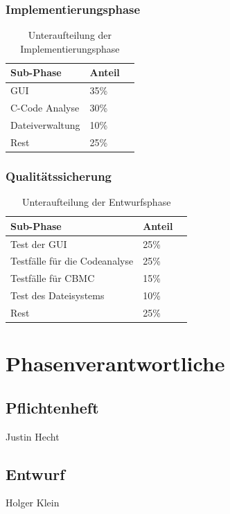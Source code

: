 \documentclass[a4paper]{scrreprt}
\begin{document}
\subsection{Implementierungsphase}

\begin{table}[H]
\centering
  \begin{tabular}{|p{3cm}|P{2cm}|P{2cm}|}
    Sub-Phase & Anteil \\ \hline
    GUI & 35\%\\ \hline
    C-Code Analyse & 30\% \\ \hline
    Dateiverwaltung & 10\% \\ \hline
    Rest & 25\%  \\
  \end{tabular}
  \newline\newline
  \caption{Unteraufteilung der Implementierungsphase}\label{impl}
\end{table} 

\subsection{Qualitätssicherung}
\begin{table}[H]
\centering
  \begin{tabular}{|p{3cm}|P{2cm}|P{2cm}|}
    Sub-Phase & Anteil \\ \hline
    Test der GUI & 25\% \\ \hline
    Testfälle  für die Codeanalyse & 25\% \\ \hline
    Testfälle für CBMC & 15\% \\ \hline
    Test des Dateisystems & 10\% \\ \hline
    Rest & 25\%  \\
  \end{tabular}
  \newline\newline
  \caption{Unteraufteilung der Entwurfsphase}\label{qs}
\end{table}


\chapter{Phasenverantwortliche}
\section{Pflichtenheft} Justin Hecht
\section{Entwurf} Holger Klein 
\end{document}
